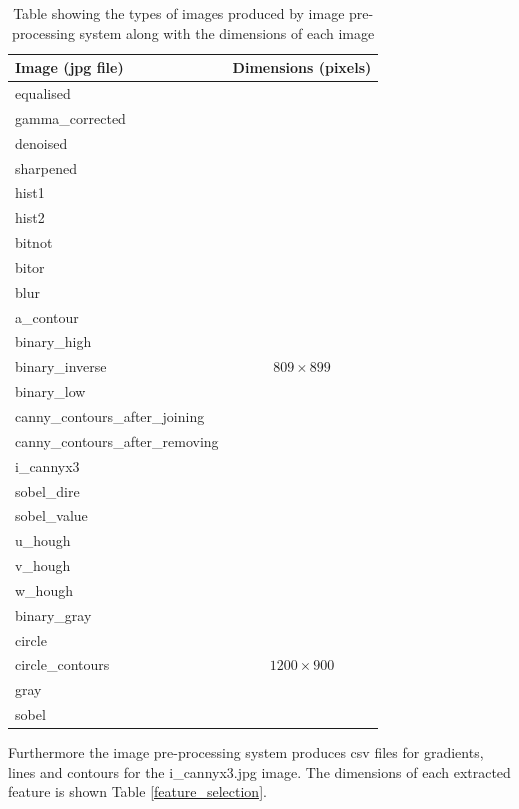 \documentclass[11pt,twocolumn]{witseiepaper}
\begin{document}
	\begin{table}[!h]
		\centering
		\caption{Table showing the types of images produced by image pre-processing system along with the dimensions of each image}
		\label{tb: image table}
		\begin{tabular}{| p{4cm} | c |}
			\hline
			Image (jpg file) & Dimensions (pixels) \\
			\hline \hline
			equalised &  \\
			gamma\_corrected &  \\
			denoised & \\
			sharpened & \\
			hist1 & \\
			hist2 & \\
			bitnot & \\
			bitor & \\
			blur & \\
			a\_contour & \\
			binary\_high & \\
			binary\_inverse & $809 \times 899$ \\
			binary\_low & \\
			canny\_contours\_after\_joining & \\
			canny\_contours\_after\_removing & \\
			i\_cannyx3 & \\
			sobel\_dire & \\
			sobel\_value & \\
			u\_hough & \\
			v\_hough & \\
			w\_hough & \\
			\hline
			binary\_gray & \\
			circle & \\
			circle\_contours & $1200 \times 900$ \\
			gray & \\
			sobel & \\
			\hline
		\end{tabular}
	\end{table}
	Furthermore the image pre-processing system produces csv files for gradients, lines and contours for the i\_cannyx3.jpg image. The dimensions of each extracted feature is shown Table \ref{feature_selection}.
	
\end{document}
